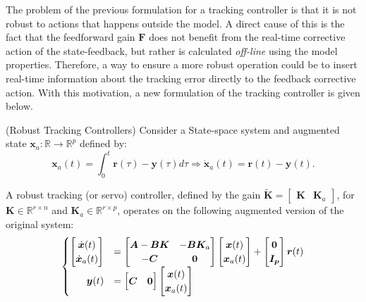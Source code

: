 \documentclass[a4paper,11pt]{book}
\numberwithin{figure}{chapter}
\numberwithin{equation}{chapter}
\numberwithin{table}{chapter}
\theoremstyle{definition}
\newtheorem{definition}{Definition}[chapter]
\newcounter{boxed-theorem}
\newcounter{boxed-lemma}
\newcounter{boxed-definition}
\newenvironment{boxed-definition}[1]
{\colorlet{shadecolor}{pastelYellow!15} \begin{shaded} \begin{definition}{#1}}
{\end{definition} \end{shaded}}
\newcounter{boxed-example}
\begin{document}
The problem of the previous formulation for a tracking controller is that it is not robust to actions that happens outside the model. A direct cause of this is the fact that the feedforward gain $\bm{F}$ does not benefit from the real-time corrective action of the state-feedback, but rather is calculated \textit{off-line} using the model properties. Therefore, a way to ensure a more robust operation could be to insert real-time information about the tracking error directly to the feedback corrective action. With this motivation, a new formulation of the tracking controller is given below.

\begin{boxed-definition}{(Robust Tracking Controllers)} \label{def:robustTracking}
    Consider a State-space system and augmented state $\bm{x}_a : \mathbb{R} \rightarrow \mathbb{R}^{p}$ defined by:
    \begin{equation}
        \bm{x}_a(t) = \int_{0}^{t} \bm{r}(\tau) - \bm{y}(\tau) d\tau \Longrightarrow \dot{\bm{x}}_a(t) = \bm{r}(t) - \bm{y}(t)
    .\end{equation}
    
\noindent A robust tracking (or servo) controller, defined by the gain $\tilde{\bm{K}} = \begin{bmatrix} \bm{K} & \bm{K}_a \end{bmatrix}$, for $\bm{K} \in \mathbb{R}^{r \times n}$ and $\bm{K}_a \in \mathbb{R}^{r \times p}$, operates on the following augmented version of the original system:
    \begin{align} \label{eq:augmentedSystem}
    \begin{cases}
        \begin{bmatrix}
            \dot{\bm{x}}(t) \\
            \dot{\bm{x}}_a(t)
        \end{bmatrix} &= \begin{bmatrix}
            \bm{A} - \bm{B} \bm{K} & -\bm{B} \bm{K}_a \\ - \bm{C} & \bm{0}
        \end{bmatrix} \begin{bmatrix}
            \bm{x}(t) \\
            \bm{x}_a(t)
        \end{bmatrix} + \begin{bmatrix}
            \bm{0} \\
            \bm{I_p}
        \end{bmatrix} \bm{r}(t)
        \\
        \hfill \bm{y}(t) &= \begin{bmatrix}
            \bm{C} & \bm{0}
        \end{bmatrix} \begin{bmatrix}
            \bm{x}(t) \\
            \bm{x}_a(t)
        \end{bmatrix}
    \end{cases}
    \end{align}
    

\end{boxed-definition}
\end{document}
